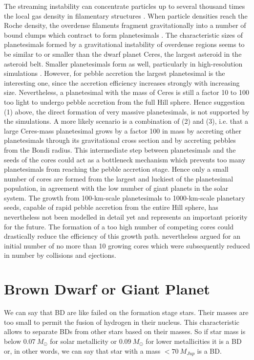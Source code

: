 The streaming instability can concentrate particles up to several thousand times the local gas density in filamentary
structures \citep{Johansen2012a}. When particle densities reach the Roche density, the overdense filaments fragment
gravitationally into a number of bound clumps which contract to form planetesimals \citep{Johansen2007b, Johansen2009a,
Nesvorn2010}. The characteristic sizes of planetesimals formed by a gravitational instability of overdense 
regions seems to be similar to or smaller than the dwarf planet Ceres, the largest asteroid in the asteroid belt. Smaller 
planetesimals form as well, particularly in high-resolution simulations \citep{Johansen2012a}. However, for pebble 
accretion the largest planetesimal is the interesting one, since the accretion efficiency increases strongly with increasing
size. Nevertheless, a planetesimal with the mass of Ceres is still a factor 10 to 100 too light to undergo pebble 
accretion from the full Hill sphere. Hence suggestion (1) above, the direct formation of very massive planetesimals, is not
supported by the simulations. A more likely scenario is a combination of (2) and (3), i.e. that a large Ceres-mass
planetesimal grows by a factor 100 in mass by accreting other planetesimals through its gravitational cross section
and by accreting pebbles from the Bondi radius. This intermediate step between planetesimals and the seeds of the
cores could act as a bottleneck mechanism which prevents too many planetesimals from reaching the pebble accretion
stage. Hence only a small number of cores are formed from the largest and luckiest of the planetesimal population, in
agreement with the low number of giant planets in the solar system. The growth from 100-km-scale planetesimals
to 1000-km-scale planetary seeds, capable of rapid pebble accretion from the entire Hill sphere, has nevertheless not
been modelled in detail yet and represents an important priority for the future. The formation of a too high number
of competing cores could drastically reduce the efficiency of this growth path. 
\cite{Nesvorn2012} nevertheless argued for an initial number of no more than 10 growing cores which were subsequently 
reduced in number by collisions and ejections.


\section{Brown Dwarf or Giant Planet}
We can say that BD are like failed on the formation stage stars. 
Their masses are too small to permit the fusion of hydrogen in their nucleus. 
This characteristic allows to separate BDs from other stars based on their masses. 
So if star mass is below $0.07\ M_\odot$ for solar metallicity 
or $0.09\ M_\odot$ for lower metallicities \citep{Burrows2001} it is a BD 
or, in other words, we can say that star with a mass  $< 70\  M_{Jup}$ is a  
BD. 

